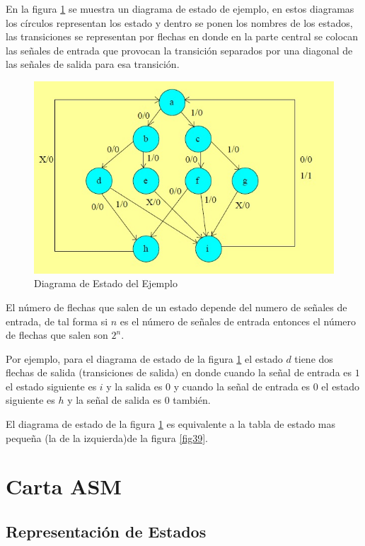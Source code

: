 \documentclass[12pt]{book}
\theoremstyle{definition}
\theoremstyle{remark}
\theoremstyle{plain}
\begin{document}
En la figura \ref{fig40} se muestra un diagrama de estado de ejemplo, en estos diagramas los círculos representan los estado y dentro se ponen los nombres de los estados, las transiciones se representan por flechas en donde en la parte central se colocan las señales de entrada que provocan la transición separados por una diagonal de las señales de salida para esa transición.

\begin{figure}
\centering
\includegraphics[width=5in]{DiagramaEstado.jpg}
\caption{Diagrama de Estado del Ejemplo}
\label{fig40}
\end{figure}

El número de flechas que salen de un estado depende del numero de señales de entrada, de tal forma si $n$ es el número de señales de entrada entonces el número de flechas que salen son $2^n$.

Por ejemplo, para el diagrama de estado de la figura \ref{fig40} el estado $d$ tiene dos flechas de salida (transiciones de salida) en donde cuando la señal de entrada es $1$ el estado siguiente es $i$ y la salida es $0$ y cuando la señal de entrada es $0$ el estado siguiente es $h$ y la señal de salida es $0$ también.

El diagrama de estado de la figura \ref{fig40} es equivalente a la tabla de estado mas pequeña (la de la izquierda)de la figura \ref{fig39}.

 
\section{Carta ASM}

\subsection{Representación de Estados}
\end{document}
